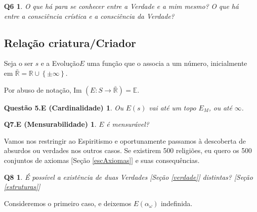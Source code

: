 \documentclass[12pt,a4paper]{article}
\begin{document}
			\newtheorem{Q6}{Q6}
			\begin{Q6} O que h\'a para se conhecer entre a Verdade e a mim mesmo? O que h\'a entre a consci\^encia cr\'istica e a consci\^encia da Verdade?
			\end{Q6}

		\subsection{Rela\c{c}\~ao criatura/Criador}\label{criaturaCriador}
			\begin{flushright}
			\end{flushright}

			Seja o ser $ s $ e a Evolu\c{c}\~ao\footnotemark[1] $ E $ uma fun\c{c}\~ao que o associa a um n\'umero, inicialmente em $ \mathbb{\bar{R}} = \mathbb{R} \cup \left\{\pm \infty\right\} $.


			Por abuso de nota\c{c}\~ao, Im $(E: S \rightarrow \mathbb{\bar{R}}) = \mathbb{E} $.

			\newtheorem{Q5.E}{Quest\~ao 5.E (Cardinalidade)}
			\begin{Q5.E} Ou $E(s)$ vai at\'e um topo $ E_M $, ou at\'e $ \infty $.
			\end{Q5.E}

			\newtheorem{Q7.E}{Q7.E (Mensurabilidade)}
			\begin{Q7.E} $E$ \'e mensur\'avel?
			\end{Q7.E}

			Vamos nos restringir ao Espiritismo e oportunamente passamos \`a descoberta de absurdos ou verdades nos outros casos. Se existirem 500 religi\~oes, eu quero os 500 conjuntos de axiomas [Se\c{c}\~ao \ref{escAxiomas}] e suas consequ\^encias.

			\newtheorem{Q8}{Q8}
			\begin{Q8} \'E poss\'ivel a exist\^encia de duas Verdades [Se\c{c}\~ao \ref{verdade}] distintas? [Se\c{c}\~ao \ref{estruturas}]
			\end{Q8}

			Consideremos o primeiro caso\footnotemark[2], e deixemos $E(\alpha_\omega)$ indefinida.

\end{document}
